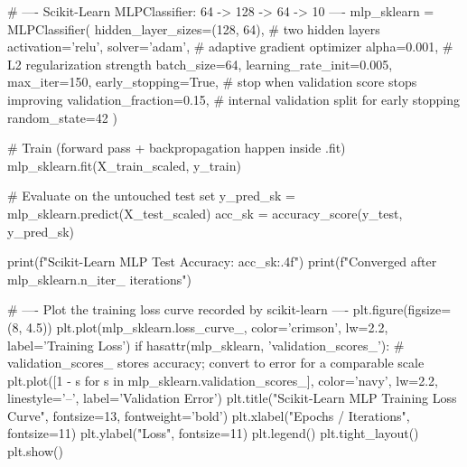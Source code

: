\begin{codebox}[title={Scikit-Learn MLPClassifier: 64 -> 128 -> 64 -> 10}]
# ---- Scikit-Learn MLPClassifier: 64 -> 128 -> 64 -> 10 ----
mlp_sklearn = MLPClassifier(
    hidden_layer_sizes=(128, 64),   # two hidden layers
    activation='relu',
    solver='adam',                  # adaptive gradient optimizer
    alpha=0.001,                    # L2 regularization strength
    batch_size=64,
    learning_rate_init=0.005,
    max_iter=150,
    early_stopping=True,            # stop when validation score stops improving
    validation_fraction=0.15,       # internal validation split for early stopping
    random_state=42
)

# Train (forward pass + backpropagation happen inside .fit)
mlp_sklearn.fit(X_train_scaled, y_train)

# Evaluate on the untouched test set
y_pred_sk = mlp_sklearn.predict(X_test_scaled)
acc_sk = accuracy_score(y_test, y_pred_sk)

print(f"Scikit-Learn MLP Test Accuracy: {acc_sk:.4f}")
print(f"Converged after {mlp_sklearn.n_iter_} iterations")

# ---- Plot the training loss curve recorded by scikit-learn ----
plt.figure(figsize=(8, 4.5))
plt.plot(mlp_sklearn.loss_curve_, color='crimson', lw=2.2, label='Training Loss')
if hasattr(mlp_sklearn, 'validation_scores_'):
    # validation_scores_ stores accuracy; convert to error for a comparable scale
    plt.plot([1 - s for s in mlp_sklearn.validation_scores_], color='navy', lw=2.2, linestyle='--', label='Validation Error')
plt.title("Scikit-Learn MLP Training Loss Curve", fontsize=13, fontweight='bold')
plt.xlabel("Epochs / Iterations", fontsize=11)
plt.ylabel("Loss", fontsize=11)
plt.legend()
plt.tight_layout()
plt.show()
\end{codebox}

